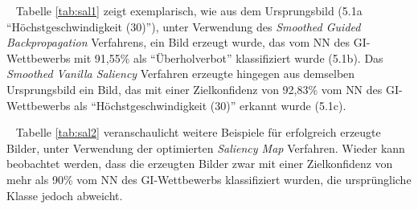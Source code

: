 ~\newline
Tabelle \ref{tab:sal1} zeigt exemplarisch, wie aus dem Ursprungsbild (5.1a "`Höchstgeschwindigkeit (30)"'), unter Verwendung des \textit{Smoothed Guided Backpropagation} Verfahrens, ein Bild erzeugt wurde, das vom \ac{NN} des \ac{GI}-Wettbewerbs mit 91,55\% als "`Überholverbot"' klassifiziert wurde (5.1b). 
Das \textit{Smoothed Vanilla Saliency} Verfahren erzeugte hingegen aus demselben Ursprungsbild ein Bild, das mit einer Zielkonfidenz von 92,83\% vom \ac{NN} des \ac{GI}-Wettbewerbs als "`Höchstgeschwindigkeit (30)"' erkannt wurde (5.1c).


~\newline
Tabelle \ref{tab:sal2} veranschaulicht weitere Beispiele für erfolgreich erzeugte Bilder, unter Verwendung der optimierten \textit{Saliency Map} Verfahren. Wieder kann beobachtet werden, dass die erzeugten Bilder zwar mit einer Zielkonfidenz von mehr als 90\% vom \ac{NN} des \ac{GI}-Wettbewerbs klassifiziert wurden, die ursprüngliche Klasse jedoch abweicht.


